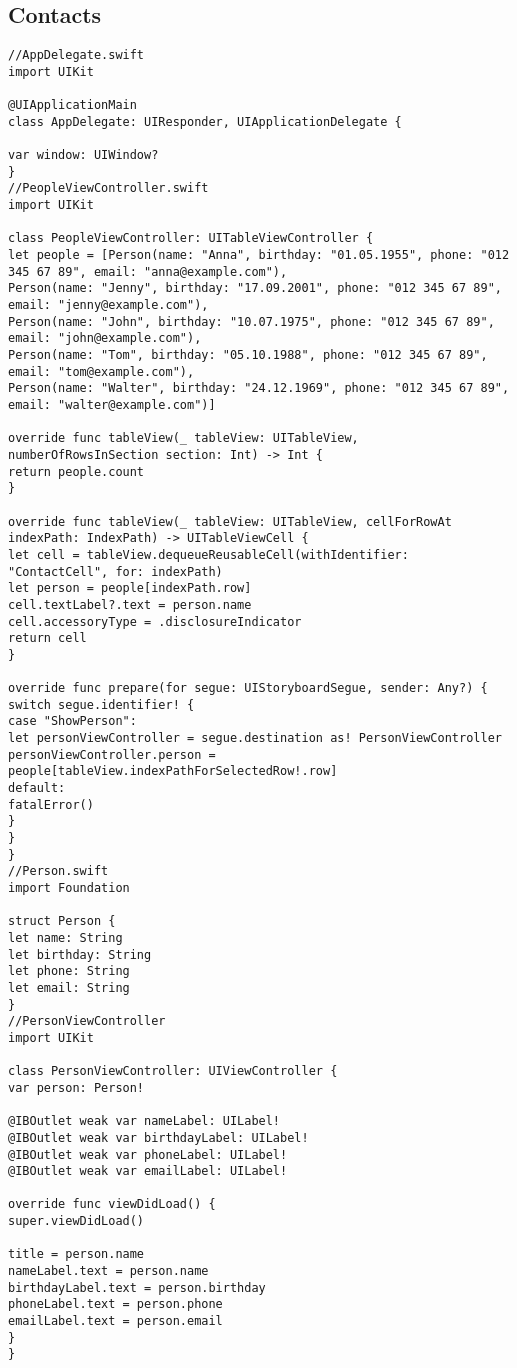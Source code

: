 \subsection{Contacts}
\begin{lstlisting}
//AppDelegate.swift
import UIKit

@UIApplicationMain
class AppDelegate: UIResponder, UIApplicationDelegate {

var window: UIWindow?
}
//PeopleViewController.swift
import UIKit

class PeopleViewController: UITableViewController {
let people = [Person(name: "Anna", birthday: "01.05.1955", phone: "012 345 67 89", email: "anna@example.com"),
Person(name: "Jenny", birthday: "17.09.2001", phone: "012 345 67 89", email: "jenny@example.com"),
Person(name: "John", birthday: "10.07.1975", phone: "012 345 67 89", email: "john@example.com"),
Person(name: "Tom", birthday: "05.10.1988", phone: "012 345 67 89", email: "tom@example.com"),
Person(name: "Walter", birthday: "24.12.1969", phone: "012 345 67 89", email: "walter@example.com")]

override func tableView(_ tableView: UITableView, numberOfRowsInSection section: Int) -> Int {
return people.count
}

override func tableView(_ tableView: UITableView, cellForRowAt indexPath: IndexPath) -> UITableViewCell {
let cell = tableView.dequeueReusableCell(withIdentifier: "ContactCell", for: indexPath)
let person = people[indexPath.row]
cell.textLabel?.text = person.name
cell.accessoryType = .disclosureIndicator
return cell
}

override func prepare(for segue: UIStoryboardSegue, sender: Any?) {
switch segue.identifier! {
case "ShowPerson":
let personViewController = segue.destination as! PersonViewController
personViewController.person = people[tableView.indexPathForSelectedRow!.row]
default:
fatalError()
}
}
}
//Person.swift
import Foundation

struct Person {
let name: String
let birthday: String
let phone: String
let email: String
}
//PersonViewController
import UIKit

class PersonViewController: UIViewController {
var person: Person!

@IBOutlet weak var nameLabel: UILabel!
@IBOutlet weak var birthdayLabel: UILabel!
@IBOutlet weak var phoneLabel: UILabel!
@IBOutlet weak var emailLabel: UILabel!

override func viewDidLoad() {
super.viewDidLoad()

title = person.name
nameLabel.text = person.name
birthdayLabel.text = person.birthday
phoneLabel.text = person.phone
emailLabel.text = person.email
}
}
\end{lstlisting}

